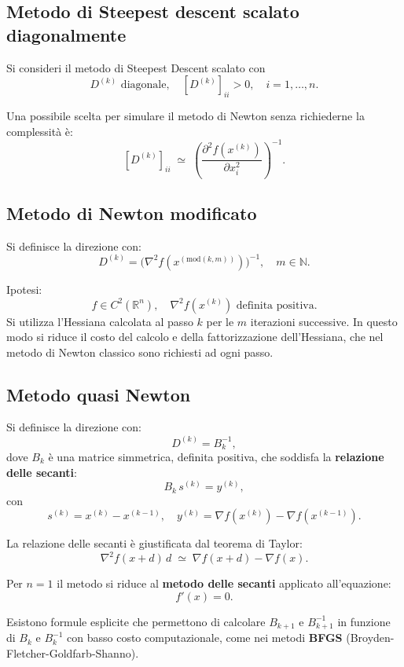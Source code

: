 \subsection{Metodo di Steepest descent scalato diagonalmente}
Si consideri il metodo di Steepest Descent scalato con
\[
D^{(k)} \text{ diagonale}, \quad [D^{(k)}]_{ii} > 0, \quad i = 1, \dots, n.
\]

Una possibile scelta per simulare il metodo di Newton senza richiederne la complessità è:
\[
[D^{(k)}]_{ii} \;\simeq\; \left( \frac{\partial^2 f(x^{(k)})}{\partial x_i^2} \right)^{-1}.
\]

\subsection{Metodo di Newton modificato }
Si definisce la direzione con:
\[
D^{(k)} = \bigl( \nabla^2 f(x^{(\text{mod}(k,m))}) \bigr)^{-1}, \quad m \in \mathbb{N}.
\]

\noindent
Ipotesi:
\[
f \in C^2(\mathbb{R}^n), \quad \nabla^2 f(x^{(k)}) \text{ definita positiva.}
\]
Si utilizza l'Hessiana calcolata al passo $k$ per le $m$ iterazioni successive.
In questo modo si riduce il costo del calcolo e della fattorizzazione dell'Hessiana,
che nel metodo di Newton classico sono richiesti ad ogni passo.

\subsection{Metodo quasi Newton}

Si definisce la direzione con:
\[
D^{(k)} = B_k^{-1},
\]
dove $B_k$ è una matrice simmetrica, definita positiva, che soddisfa la \textbf{relazione delle secanti}:
\[
B_k \, s^{(k)} = y^{(k)},
\]
con
\[
s^{(k)} = x^{(k)} - x^{(k-1)}, \quad 
y^{(k)} = \nabla f(x^{(k)}) - \nabla f(x^{(k-1)}).
\]

La relazione delle secanti è giustificata dal teorema di Taylor:
\[
\nabla^2 f(x + d)\, d \;\simeq\; \nabla f(x + d) - \nabla f(x).
\]

Per $n = 1$ il metodo si riduce al \textbf{metodo delle secanti} applicato all'equazione:
\[
f'(x) = 0.
\]

Esistono formule esplicite che permettono di calcolare $B_{k+1}$ e $B_{k+1}^{-1}$ in funzione di $B_k$ e $B_k^{-1}$ con basso costo computazionale, come nei metodi \textbf{BFGS} (Broyden-Fletcher-Goldfarb-Shanno).

